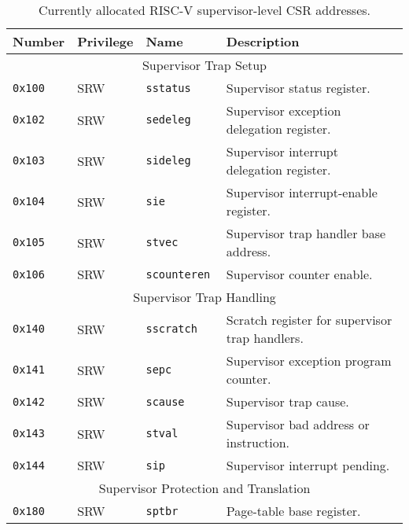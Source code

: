 \begin{table}[htb!]
\begin{center}
\begin{tabular}{|l|l|l|l|}
\hline
Number    & Privilege & Name & Description \\
\hline  
\multicolumn{4}{|c|}{Supervisor Trap Setup} \\
\hline
\tt 0x100 & SRW  &\tt sstatus    & Supervisor status register. \\
\tt 0x102 & SRW  &\tt sedeleg    & Supervisor exception delegation register. \\
\tt 0x103 & SRW  &\tt sideleg    & Supervisor interrupt delegation register. \\
\tt 0x104 & SRW  &\tt sie        & Supervisor interrupt-enable register. \\
\tt 0x105 & SRW  &\tt stvec      & Supervisor trap handler base address. \\
\tt 0x106 & SRW  &\tt scounteren & Supervisor counter enable. \\
\hline
\multicolumn{4}{|c|}{Supervisor Trap Handling} \\
\hline
\tt 0x140 & SRW  &\tt sscratch   & Scratch register for supervisor trap handlers. \\
\tt 0x141 & SRW  &\tt sepc       & Supervisor exception program counter. \\
\tt 0x142 & SRW  &\tt scause     & Supervisor trap cause. \\
\tt 0x143 & SRW  &\tt stval      & Supervisor bad address or instruction. \\
\tt 0x144 & SRW  &\tt sip        & Supervisor interrupt pending. \\
\hline
\multicolumn{4}{|c|}{Supervisor Protection and Translation} \\
\hline
\tt 0x180 & SRW  &\tt sptbr      & Page-table base register. \\
\hline
\end{tabular}
\end{center}
\caption{Currently allocated RISC-V supervisor-level CSR addresses.}
\label{scsrnames}
\end{table}

